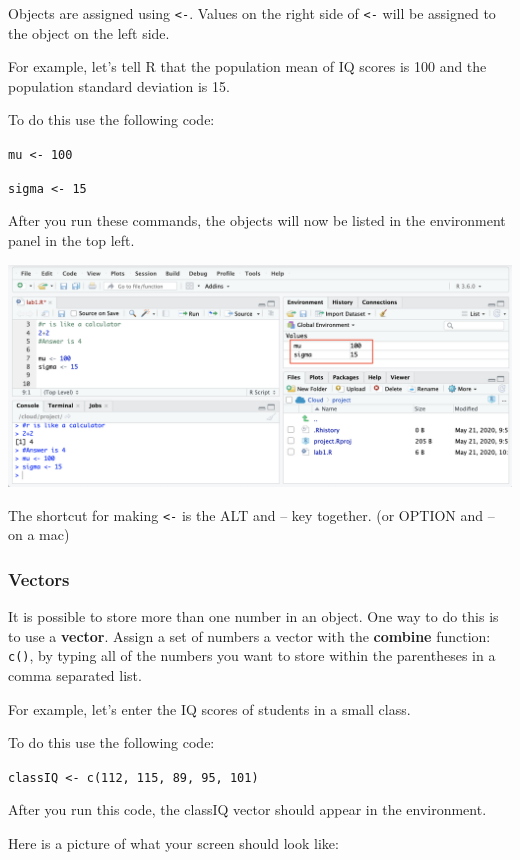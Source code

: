 \documentclass[
]{book}
\begin{document}
Objects are assigned using \texttt{\textless{}-}. Values on the right side of \texttt{\textless{}-} will be assigned to the object on the left side.

For example, let's tell R that the population mean of IQ scores is 100 and the population standard deviation is 15.

To do this use the following code:

\texttt{mu\ \textless{}-\ 100}

\texttt{sigma\ \textless{}-\ 15}

After you run these commands, the objects will now be listed in the environment panel in the top left.

\includegraphics{img/object.png}

The shortcut for making \texttt{\textless{}-} is the ALT and -- key together. (or OPTION and -- on a mac)

\hypertarget{vectors}{%
\subsubsection{Vectors}\label{vectors}}

It is possible to store more than one number in an object. One way to do this is to use a \textbf{vector}. Assign a set of numbers a vector with the \textbf{combine} function: \texttt{c()}, by typing all of the numbers you want to store within the parentheses in a comma separated list.

For example, let's enter the IQ scores of students in a small class.

To do this use the following code:

\texttt{classIQ\ \textless{}-\ c(112,\ 115,\ 89,\ 95,\ 101)}

After you run this code, the classIQ vector should appear in the environment.

Here is a picture of what your screen should look like:
\end{document}
